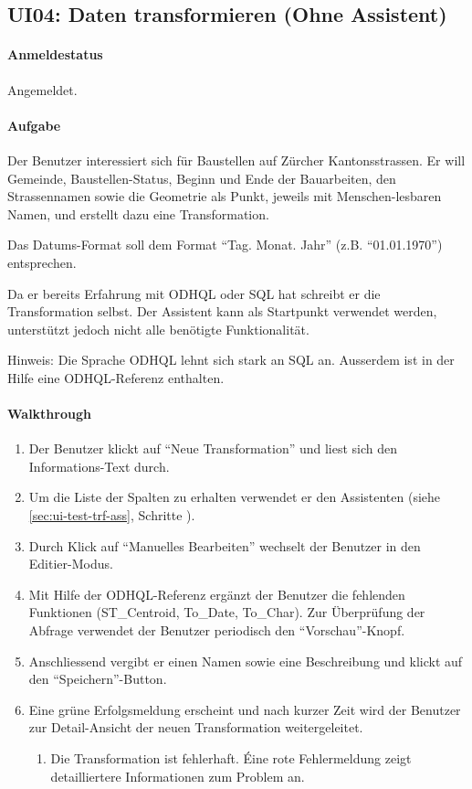 \subsection{UI04: Daten transformieren (Ohne Assistent)}
\paragraph{Anmeldestatus} Angemeldet.

\paragraph{Aufgabe} Der Benutzer interessiert sich für Baustellen auf Zürcher Kantonsstrassen. Er will Gemeinde, Baustellen-Status, Beginn und Ende der Bauarbeiten, den Strassennamen sowie die Geometrie als Punkt, jeweils mit Menschen-lesbaren Namen, und erstellt dazu eine Transformation.

Das Datums-Format soll dem Format ``Tag. Monat. Jahr'' (z.B. ``01.01.1970'') entsprechen.

Da er bereits Erfahrung mit ODHQL oder SQL hat schreibt er die Transformation selbst. Der Assistent kann als Startpunkt verwendet werden, unterstützt jedoch nicht alle benötigte Funktionalität.

Hinweis: Die Sprache ODHQL lehnt sich stark an SQL an. Ausserdem ist in der Hilfe eine ODHQL-Referenz enthalten.

\paragraph{Walkthrough}
\begin{enumerate}
\item Der Benutzer klickt auf ``Neue Transformation'' und liest sich den Informations-Text durch.
\item Um die Liste der Spalten zu erhalten verwendet er den Assistenten (siehe \cref{sec:ui-test-trf-ass}, Schritte ).
\item Durch Klick auf ``Manuelles Bearbeiten'' wechselt der Benutzer in den Editier-Modus.
\item Mit Hilfe der ODHQL-Referenz ergänzt der Benutzer die fehlenden Funktionen (ST\_Centroid, To\_Date, To\_Char). Zur Überprüfung der Abfrage verwendet der Benutzer periodisch den ``Vorschau''-Knopf.
\item Anschliessend vergibt er einen Namen sowie eine Beschreibung und klickt auf den ``Speichern''-Button.
\item Eine grüne Erfolgsmeldung erscheint und nach kurzer Zeit wird der Benutzer zur Detail-Ansicht der neuen Transformation weitergeleitet.
  \begin{enumerate}[label=\labelenumi\alph*.]
  \item Die Transformation ist fehlerhaft. Éine rote Fehlermeldung zeigt detailliertere Informationen zum Problem an.
  \end{enumerate}
\end{enumerate}

